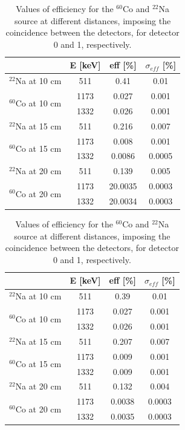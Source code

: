 \begin{table}[h]
    \begin{subtable}
        \centering
        \begin{tabular}{|c|c|c|c|}
        \hline
        & E [keV]  & eff [\%] &$\sigma_{eff}$ [\%]  \\
        \hline
        $^{22}$Na at 10 cm & 511 &0.41&0.01\\
        \hline
        \multirow{2}{*}{$^{60}$Co at 10 cm}&1173 &0.027 & 0.001 \\ 
        &1332 &0.026 & 0.001 \\
        \hline
        $^{22}$Na at 15 cm & 511 &0.216&0.007\\
        \hline
        \multirow{2}{*}{$^{60}$Co at 15 cm}&1173 &0.008 & 0.001 \\ 
        &1332 &0.0086 & 0.0005 \\
        \hline
        $^{22}$Na at 20 cm & 511 &0.139&0.005\\
        \hline
        \multirow{2}{*}{$^{60}$Co at 20 cm}&1173 &20.0035 & 0.0003 \\
        &1332 &20.0034 & 0.0003 \\
        \hline
        \end{tabular}
    \end{subtable}
    \qquad
    \qquad
    \qquad
    \begin{subtable}
        \centering
        \begin{tabular}{|c|c|c|c|}
        \hline
        & E [keV]  & eff [\%] &$\sigma_{eff}$ [\%]  \\
        \hline
        $^{22}$Na at 10 cm & 511 &0.39&0.01\\
        \hline
        \multirow{2}{*}{$^{60}$Co at 10 cm}&1173 &0.027 & 0.001 \\ 
        &1332 &0.026 & 0.001 \\
        \hline
        $^{22}$Na at 15 cm & 511 &0.207&0.007\\
        \hline
        \multirow{2}{*}{$^{60}$Co at 15 cm}&1173 &0.009 & 0.001 \\ 
        &1332 &0.009 & 0.001 \\
        \hline
        $^{22}$Na at 20 cm & 511 &0.132&0.004\\
        \hline
        \multirow{2}{*}{$^{60}$Co at 20 cm}&1173 &0.0038 & 0.0003 \\
        &1332 &0.0035 & 0.0003 \\
        \hline
        \end{tabular}
     \end{subtable}
     \caption{Values of efficiency for the $^{60}$Co and $^{22}$Na source at different distances, imposing the coincidence between the detectors, for detector 0 and 1, respectively.}
     \label{table:eff_coin}
\end{table}


